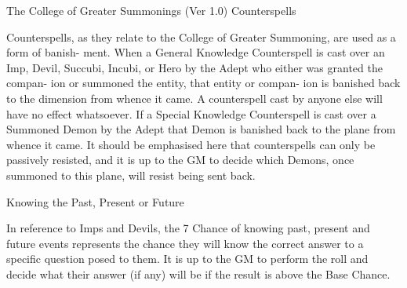 \begin{Chapter}{The College of Greater Summonings (Ver 1.0)}
Counterspells 

Counterspells,  as  they  relate  to  the  College  of 
Greater Summoning, are used as a form of banish-
ment. When  a  General  Knowledge  Counterspell  is 
cast  over  an  Imp,  Devil,  Succubi,  Incubi,  or  Hero 
by  the  Adept  who  either  was  granted  the  compan-
ion or summoned the entity, that entity or compan-
ion is banished back to the dimension from whence 
it  came.  A  counterspell  cast  by  anyone  else  will 
have no effect whatsoever. If a Special Knowledge 
Counterspell  is  cast  over  a  Summoned  Demon  by 
the Adept that Demon is banished back to the plane 
from whence it came. It should be emphasised here 
that  counterspells  can  only  be  passively  resisted, 
and  it  is  up  to  the  GM  to  decide  which  Demons, 
once summoned to this plane, will resist being sent 
back. 

Knowing the Past, Present or Future 

In  reference  to  Imps  and  Devils,  the  7%
Chance of knowing past, present and future events 
represents  the  chance  they  will  know  the  correct 
answer  to  a  specific  question  posed  to  them.  It  is 
up to  the  GM  to  perform the  roll  and  decide  what 
their  answer  (if  any)  will  be  if  the  result  is  above 
the Base Chance. 

\end{Chapter}

